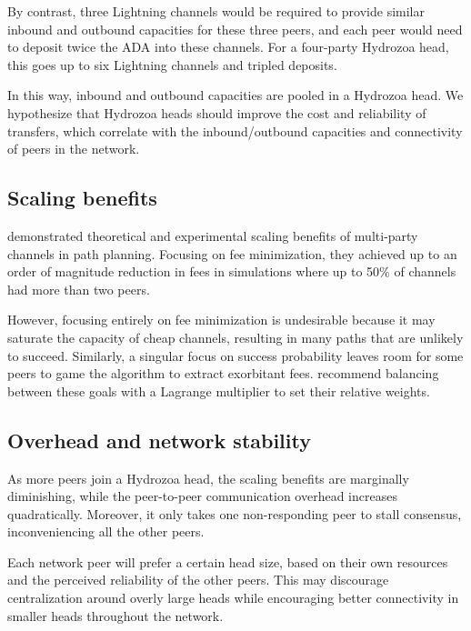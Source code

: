 \documentclass[11pt,a4paper,oneside]{article}
\begin{document}
\begin{multicols}{2}
By contrast, three Lightning channels would be required to provide similar inbound and outbound capacities for these three peers, and each peer would need to deposit twice the ADA into these channels.
For a four-party Hydrozoa head, this goes up to six Lightning channels and tripled deposits.

In this way, inbound and outbound capacities are pooled in a Hydrozoa head.
We hypothesize that Hydrozoa heads should improve the cost and reliability of transfers, which correlate with the inbound/outbound capacities and connectivity of peers in the network.

\subsection{Scaling benefits}%
\label{h:hydrozoa-scaling-benefits}
  
\citet{CorcoranLewisPathPlanningPayment2024} demonstrated theoretical and experimental scaling benefits of multi-party channels in path planning.
Focusing on fee minimization, they achieved up to an order of magnitude reduction in fees in simulations where up to 50\% of channels had more than two peers.

However, focusing entirely on fee minimization is undesirable because it may saturate the capacity of cheap channels, resulting in many paths that are unlikely to succeed.
Similarly, a singular focus on success probability leaves room for some peers to game the algorithm to extract exorbitant fees.
\citet{PickhardtRichterOptimallyReliableCheap2021} recommend balancing between these goals with a Lagrange multiplier to set their relative weights.

\subsection{Overhead and network stability}%
\label{h:hydrozoa-overhead-stability}

As more peers join a Hydrozoa head, the scaling benefits are marginally diminishing, while the peer-to-peer communication overhead increases quadratically.
Moreover, it only takes one non-responding peer to stall consensus, inconveniencing all the other peers.

Each network peer will prefer a certain head size, based on their own resources and the perceived reliability of the other peers.
This may discourage centralization around overly large heads while encouraging better connectivity in smaller heads throughout the network.


\end{multicols}
\end{document}
